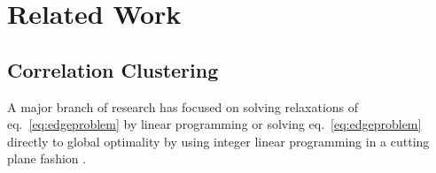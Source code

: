 \documentclass[10pt,twocolumn,letterpaper]{article}
\DeclareMathOperator*{\argmin}{arg\,min}
\begin{document}






\section{Related Work}\label{sec:related_work}

\subsection{Correlation Clustering}\label{sec:cc}
A major branch of research has focused on solving 
relaxations of eq.~\ref{eq:edgeproblem} by linear programming
or solving  eq.~\ref{eq:edgeproblem} directly to global optimality
by using integer linear programming in a cutting plane fashion  \cite{kappes_2011_emmcvpr,andres_2011_iccv}.
\end{document}
